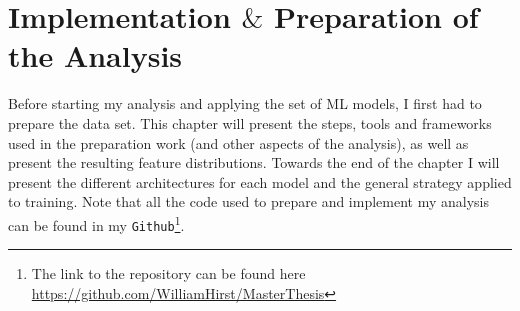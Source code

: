 \chapter{Implementation $\&$ Preparation of the Analysis}\label{chap:Implementation}
Before starting my analysis and applying the set of \ac{ML} models, I first had to prepare the data set. This chapter 
will present the steps, tools and frameworks used in the preparation work (and other aspects of the analysis), as well as present the 
resulting feature distributions. Towards the end of the chapter I will present the different architectures for each model and the general 
strategy applied to training. Note that all the code used to prepare and implement my analysis can be found in my \verb!Github!\footnote{
The link to the repository can be found here \url{https://github.com/WilliamHirst/MasterThesis}}.

